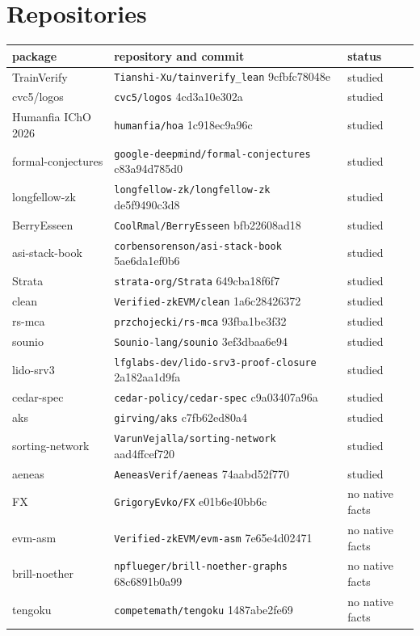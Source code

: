 \documentclass[11pt]{article}
\begin{document}
\appendix
\section{Repositories}\label{app:repos}
\footnotesize
\begin{tabular}{lll}\toprule
package & repository and commit & status\\\midrule
TrainVerify & \texttt{Tianshi-Xu/tainverify\_lean} 9cfbfc78048e & studied\\
cvc5/logos & \texttt{cvc5/logos} 4cd3a10e302a & studied\\
Humanfia IChO 2026 & \texttt{humanfia/hoa} 1c918ec9a96c & studied\\
formal-conjectures & \texttt{google-deepmind/formal-conjectures} c83a94d785d0 & studied\\
longfellow-zk & \texttt{longfellow-zk/longfellow-zk} de5f9490c3d8 & studied\\
BerryEsseen & \texttt{CoolRmal/BerryEsseen} bfb22608ad18 & studied\\
asi-stack-book & \texttt{corbensorenson/asi-stack-book} 5ae6da1ef0b6 & studied\\
Strata & \texttt{strata-org/Strata} 649cba18f6f7 & studied\\
clean & \texttt{Verified-zkEVM/clean} 1a6c28426372 & studied\\
rs-mca & \texttt{przchojecki/rs-mca} 93fba1be3f32 & studied\\
sounio & \texttt{Sounio-lang/sounio} 3ef3dbaa6e94 & studied\\
lido-srv3 & \texttt{lfglabs-dev/lido-srv3-proof-closure} 2a182aa1d9fa & studied\\
cedar-spec & \texttt{cedar-policy/cedar-spec} c9a03407a96a & studied\\
aks & \texttt{girving/aks} c7fb62ed80a4 & studied\\
sorting-network & \texttt{VarunVejalla/sorting-network} aad4ffcef720 & studied\\
aeneas & \texttt{AeneasVerif/aeneas} 74aabd52f770 & studied\\\midrule
FX & \texttt{GrigoryEvko/FX} e01b6e40bb6c & no native facts\\
evm-asm & \texttt{Verified-zkEVM/evm-asm} 7e65e4d02471 & no native facts\\
brill-noether & \texttt{npflueger/brill-noether-graphs} 68c6891b0a99 & no native facts\\
tengoku & \texttt{competemath/tengoku} 1487abe2fe69 & no native facts\\

\end{tabular}
\end{document}
